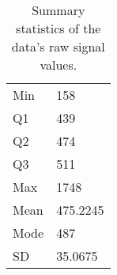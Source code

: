 \begin{table}
    \caption{\label{tab:rawsig} Summary statistics of the data's raw signal values.}
    \begin{tabular}{|l|l|}
        \hline
Min & 158\\
	    Q1 & 439\\

Q2 & 474\\
	    Q3 & 511\\
Max & 1748\\
\hline
Mean & 475.2245\\
	    Mode & 487\\
SD & 35.0675\\
	\hline
    \end{tabular}
\end{table}
